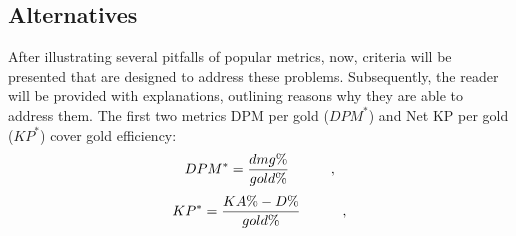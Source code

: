 \documentclass{article}
\begin{document}
\subsection{Alternatives}
After illustrating several pitfalls of popular metrics, now, criteria will be presented that are designed to address these problems. Subsequently, the reader will be provided with explanations, outlining reasons why they are able to address them. \newline The first two metrics DPM per gold ($DPM^*$) and Net KP per gold ($KP^*$) cover gold efficiency:
\begin{equation}
DPM^* = \frac{dmg \%}{gold \%} \indent \indent ,
\end{equation}
\begin{equation}
KP^* =  \frac{KA \% - D \%}{gold \%} \indent \indent ,
\end{equation}
\end{document}
